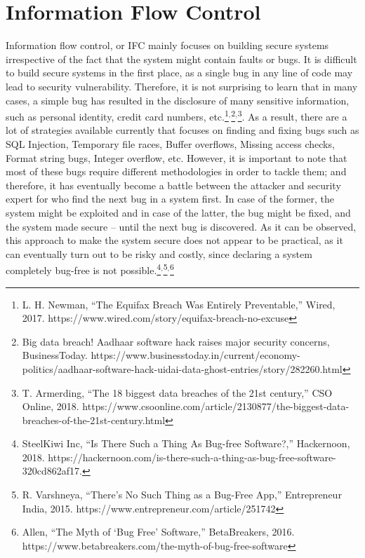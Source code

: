 \section{Information Flow Control}
\label{section:InformationFlowControl}
Information flow control, or IFC mainly focuses on building secure systems irrespective of the fact that the system might contain faults or bugs. It is difficult to build secure systems in the first place, as a single bug in any line of code may lead to security vulnerability. Therefore, it is not surprising to learn that in many cases, a simple bug has resulted in the disclosure of many sensitive information, such as personal identity, credit card numbers, etc.\footnote{L. H. Newman, “The Equifax Breach Was Entirely Preventable,” Wired, 2017. https://www.wired.com/story/equifax-breach-no-excuse}$^{,}$\footnote{Big data breach! Aadhaar software hack raises major security concerns, BusinessToday. https://www.businesstoday.in/current/economy-politics/aadhaar-software-hack-uidai-data-ghost-entries/story/282260.html}$^{,}$\footnote{T. Armerding, “The 18 biggest data breaches of the 21st century,” CSO Online, 2018. https://www.csoonline.com/article/2130877/the-biggest-data-breaches-of-the-21st-century.html}. As a result, there are a lot of strategies available currently that focuses on finding and fixing bugs such as SQL Injection, Temporary file races, Buffer overflows, Missing access checks, Format string bugs, Integer overflow, etc. However, it is important to note that most of these bugs require different methodologies in order to tackle them; and therefore, it has eventually become a battle between the attacker and security expert for who find the next bug in a system first. In case of the former, the system might be exploited and in case of the latter, the bug might be fixed, and the system made secure – until the next bug is discovered. As it can be observed, this approach to make the system secure does not appear to be practical, as it can eventually turn out to be risky and costly, since declaring a system completely bug-free is not possible.\footnote{SteelKiwi Inc, “Is There Such a Thing As Bug-free Software?,” Hackernoon, 2018. https://hackernoon.com/is-there-such-a-thing-as-bug-free-software-320cd862af17.}$^{,}$\footnote{R. Varshneya, “There’s No Such Thing as a Bug-Free App,” Entrepreneur India, 2015. https://www.entrepreneur.com/article/251742}$^{,}$\footnote{Allen, “The Myth of ‘Bug Free’ Software,” BetaBreakers, 2016. https://www.betabreakers.com/the-myth-of-bug-free-software}

